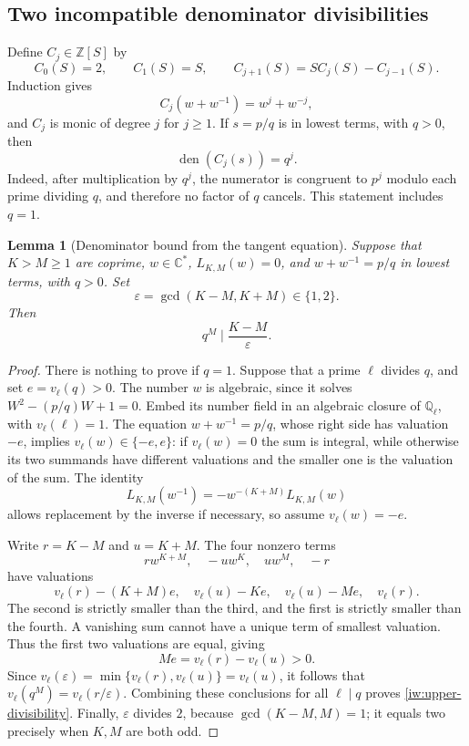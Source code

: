 \documentclass[11pt,a4paper]{article}
\newtheorem{lemma}[theorem]{Lemma}
\theoremstyle{definition}
\theoremstyle{remark}
\begin{document}
\subsection{Two incompatible denominator divisibilities}

Define \(C_j\in\mathbb Z[S]\) by
\begin{equation}\label{iw:C}
 C_0(S)=2,\qquad C_1(S)=S,\qquad
 C_{j+1}(S)=SC_j(S)-C_{j-1}(S).
\end{equation}
Induction gives
\[
 C_j(w+w^{-1})=w^j+w^{-j},
\]
and \(C_j\) is monic of degree \(j\) for \(j\ge1\).
If \(s=p/q\) is in lowest terms, with \(q>0\), then
\begin{equation}\label{iw:monic-denominator}
 \operatorname{den}(C_j(s))=q^j.
\end{equation}
Indeed, after multiplication by \(q^j\), the numerator is
congruent to \(p^j\) modulo each prime dividing \(q\), and therefore
no factor of \(q\) cancels. This statement includes \(q=1\).

\begin{lemma}[Denominator bound from the tangent equation]
\label{iw:tangent-denominator}
Suppose that \(K>M\ge1\) are coprime, \(w\in\mathbb C^*\),
\(L_{K,M}(w)=0\), and \(w+w^{-1}=p/q\) in lowest terms, with
\(q>0\). Set
\[
 \varepsilon=\gcd(K-M,K+M)\in\{1,2\}.
\]
Then
\begin{equation}\label{iw:upper-divisibility}
 q^M\mid\frac{K-M}{\varepsilon}.
\end{equation}
\end{lemma}

\begin{proof}
There is nothing to prove if \(q=1\). Suppose that a prime
\(\ell\) divides \(q\), and set \(e=v_\ell(q)>0\).
The number \(w\) is algebraic, since it solves
\(W^2-(p/q)W+1=0\). Embed its number field in an algebraic closure
of \(\mathbb Q_\ell\), with \(v_\ell(\ell)=1\).
The equation \(w+w^{-1}=p/q\), whose right side has valuation
\(-e\), implies \(v_\ell(w)\in\{-e,e\}\): if \(v_\ell(w)=0\)
the sum is integral, while otherwise its two summands have
different valuations and the smaller one is the valuation of the sum.
The identity
\[
 L_{K,M}(w^{-1})=-w^{-(K+M)}L_{K,M}(w)
\]
allows replacement by the inverse if necessary, so assume
\(v_\ell(w)=-e\).

Write \(r=K-M\) and \(u=K+M\).
The four nonzero terms
\[
 rw^{K+M},\quad -uw^K,\quad uw^M,\quad -r
\]
have valuations
\[
 v_\ell(r)-(K+M)e,\quad v_\ell(u)-Ke,\quad
 v_\ell(u)-Me,\quad v_\ell(r).
\]
The second is strictly smaller than the third, and the first
is strictly smaller than the fourth. A vanishing sum cannot
have a unique term of smallest valuation. Thus the first two
valuations are equal, giving
\[
 Me=v_\ell(r)-v_\ell(u)>0.
\]
Since \(v_\ell(\varepsilon)=
\min\{v_\ell(r),v_\ell(u)\}=v_\ell(u)\), it follows that
\(v_\ell(q^M)=v_\ell(r/\varepsilon)\).
Combining these conclusions for all \(\ell\mid q\) proves
\eqref{iw:upper-divisibility}.
Finally, \(\varepsilon\) divides \(2\), because
\(\gcd(K-M,M)=1\); it equals two precisely when \(K,M\) are both odd.
\end{proof}
\end{document}
